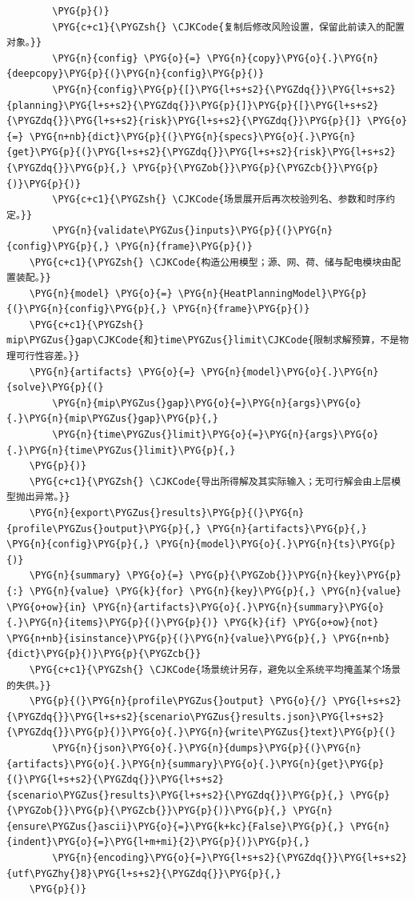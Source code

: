 \begin{Verbatim}
        \PYG{p}{)}
        \PYG{c+c1}{\PYGZsh{} \CJKCode{复制后修改风险设置，保留此前读入的配置对象。}}
        \PYG{n}{config} \PYG{o}{=} \PYG{n}{copy}\PYG{o}{.}\PYG{n}{deepcopy}\PYG{p}{(}\PYG{n}{config}\PYG{p}{)}
        \PYG{n}{config}\PYG{p}{[}\PYG{l+s+s2}{\PYGZdq{}}\PYG{l+s+s2}{planning}\PYG{l+s+s2}{\PYGZdq{}}\PYG{p}{]}\PYG{p}{[}\PYG{l+s+s2}{\PYGZdq{}}\PYG{l+s+s2}{risk}\PYG{l+s+s2}{\PYGZdq{}}\PYG{p}{]} \PYG{o}{=} \PYG{n+nb}{dict}\PYG{p}{(}\PYG{n}{specs}\PYG{o}{.}\PYG{n}{get}\PYG{p}{(}\PYG{l+s+s2}{\PYGZdq{}}\PYG{l+s+s2}{risk}\PYG{l+s+s2}{\PYGZdq{}}\PYG{p}{,} \PYG{p}{\PYGZob{}}\PYG{p}{\PYGZcb{}}\PYG{p}{)}\PYG{p}{)}
        \PYG{c+c1}{\PYGZsh{} \CJKCode{场景展开后再次校验列名、参数和时序约定。}}
        \PYG{n}{validate\PYGZus{}inputs}\PYG{p}{(}\PYG{n}{config}\PYG{p}{,} \PYG{n}{frame}\PYG{p}{)}
    \PYG{c+c1}{\PYGZsh{} \CJKCode{构造公用模型；源、网、荷、储与配电模块由配置装配。}}
    \PYG{n}{model} \PYG{o}{=} \PYG{n}{HeatPlanningModel}\PYG{p}{(}\PYG{n}{config}\PYG{p}{,} \PYG{n}{frame}\PYG{p}{)}
    \PYG{c+c1}{\PYGZsh{} mip\PYGZus{}gap\CJKCode{和}time\PYGZus{}limit\CJKCode{限制求解预算，不是物理可行性容差。}}
    \PYG{n}{artifacts} \PYG{o}{=} \PYG{n}{model}\PYG{o}{.}\PYG{n}{solve}\PYG{p}{(}
        \PYG{n}{mip\PYGZus{}gap}\PYG{o}{=}\PYG{n}{args}\PYG{o}{.}\PYG{n}{mip\PYGZus{}gap}\PYG{p}{,}
        \PYG{n}{time\PYGZus{}limit}\PYG{o}{=}\PYG{n}{args}\PYG{o}{.}\PYG{n}{time\PYGZus{}limit}\PYG{p}{,}
    \PYG{p}{)}
    \PYG{c+c1}{\PYGZsh{} \CJKCode{导出所得解及其实际输入；无可行解会由上层模型抛出异常。}}
    \PYG{n}{export\PYGZus{}results}\PYG{p}{(}\PYG{n}{profile\PYGZus{}output}\PYG{p}{,} \PYG{n}{artifacts}\PYG{p}{,} \PYG{n}{config}\PYG{p}{,} \PYG{n}{model}\PYG{o}{.}\PYG{n}{ts}\PYG{p}{)}
    \PYG{n}{summary} \PYG{o}{=} \PYG{p}{\PYGZob{}}\PYG{n}{key}\PYG{p}{:} \PYG{n}{value} \PYG{k}{for} \PYG{n}{key}\PYG{p}{,} \PYG{n}{value} \PYG{o+ow}{in} \PYG{n}{artifacts}\PYG{o}{.}\PYG{n}{summary}\PYG{o}{.}\PYG{n}{items}\PYG{p}{(}\PYG{p}{)} \PYG{k}{if} \PYG{o+ow}{not} \PYG{n+nb}{isinstance}\PYG{p}{(}\PYG{n}{value}\PYG{p}{,} \PYG{n+nb}{dict}\PYG{p}{)}\PYG{p}{\PYGZcb{}}
    \PYG{c+c1}{\PYGZsh{} \CJKCode{场景统计另存，避免以全系统平均掩盖某个场景的失供。}}
    \PYG{p}{(}\PYG{n}{profile\PYGZus{}output} \PYG{o}{/} \PYG{l+s+s2}{\PYGZdq{}}\PYG{l+s+s2}{scenario\PYGZus{}results.json}\PYG{l+s+s2}{\PYGZdq{}}\PYG{p}{)}\PYG{o}{.}\PYG{n}{write\PYGZus{}text}\PYG{p}{(}
        \PYG{n}{json}\PYG{o}{.}\PYG{n}{dumps}\PYG{p}{(}\PYG{n}{artifacts}\PYG{o}{.}\PYG{n}{summary}\PYG{o}{.}\PYG{n}{get}\PYG{p}{(}\PYG{l+s+s2}{\PYGZdq{}}\PYG{l+s+s2}{scenario\PYGZus{}results}\PYG{l+s+s2}{\PYGZdq{}}\PYG{p}{,} \PYG{p}{\PYGZob{}}\PYG{p}{\PYGZcb{}}\PYG{p}{)}\PYG{p}{,} \PYG{n}{ensure\PYGZus{}ascii}\PYG{o}{=}\PYG{k+kc}{False}\PYG{p}{,} \PYG{n}{indent}\PYG{o}{=}\PYG{l+m+mi}{2}\PYG{p}{)}\PYG{p}{,}
        \PYG{n}{encoding}\PYG{o}{=}\PYG{l+s+s2}{\PYGZdq{}}\PYG{l+s+s2}{utf\PYGZhy{}8}\PYG{l+s+s2}{\PYGZdq{}}\PYG{p}{,}
    \PYG{p}{)}
\end{Verbatim}
